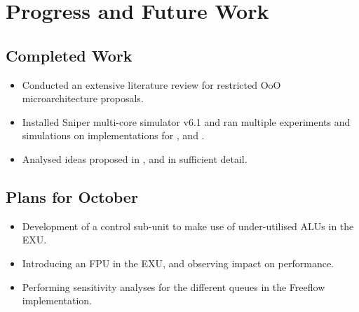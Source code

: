 \documentclass[a4paper,12pt, final]{report}
\begin{document}

\chapter{Progress and Future Work}

\section{Completed Work}

\begin{itemize}
    \item Conducted an extensive literature review for restricted OoO microarchitecture proposals.
    \item Installed Sniper multi-core simulator v6.1 and ran multiple experiments and simulations on implementations for \cite{loadslice}, \cite{freeflow} and \cite{forwardslice}.
    \item Analysed ideas proposed in \cite{fxa}, \cite{remo} and \cite{remora} in sufficient detail.
\end{itemize}

\section{Plans for October}


\begin{itemize}
    \item Development of a control sub-unit to make use of under-utilised ALUs in the EXU.
    \item Introducing an FPU in the EXU, and observing impact on performance.
    \item Performing sensitivity analyses for the different queues in the Freeflow implementation.
\end{itemize}


{}
\end{document}
